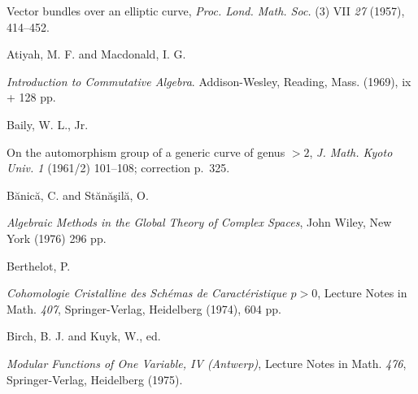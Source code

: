 {\noindent\hangindent=25bp\hspace*{6bp}%
Vector bundles over an elliptic curve, \emph{Proc. Lond. Math. Soc.} (3) VII \emph{27} (1957), 414--452.\par
\par\vspace{2.15pt}\noindent \hypertarget{bib-473-6}{}Atiyah, M. F. and Macdonald, I. G.\par
\noindent\hangindent=25bp\hspace*{6bp}%
\emph{Introduction to Commutative Algebra}. Addison-Wesley, Reading, Mass. (1969), ix + 128 pp.\par
\par\vspace{2.15pt}\noindent \hypertarget{bib-473-7}{}Baily, W. L., Jr.\par
\noindent\hangindent=25bp\hspace*{6bp}%
On the automorphism group of a generic curve of genus $>2$, \emph{J. Math. Kyoto Univ. 1} (1961/2) 101--108; correction p.~325.\par
\par\vspace{2.15pt}\noindent \hypertarget{bib-473-8}{}B\u{a}nic\u{a}, C. and St\u{a}n\u{a}\c{s}il\u{a}, O.\par
\noindent\hangindent=25bp\hspace*{6bp}%
\emph{Algebraic Methods in the Global Theory of Complex Spaces}, John Wiley, New York (1976) 296 pp.\par
\par\vspace{2.15pt}\noindent \hypertarget{bib-473-9}{}Berthelot, P.\par
\noindent\hangindent=25bp\hspace*{6bp}%
\emph{Cohomologie Cristalline des Sch\'emas de Caract\'eristique $p>0$}, Lecture Notes in Math. \emph{407}, Springer-Verlag, Heidelberg (1974), 604 pp.\par
\par\vspace{2.15pt}\noindent \hypertarget{bib-473-10}{}Birch, B. J. and Kuyk, W., ed.\par
\noindent\hangindent=25bp\hspace*{6bp}%
\emph{Modular Functions of One Variable, IV (Antwerp)}, Lecture Notes in Math. \emph{476}, Springer-Verlag, Heidelberg (1975).\par
}

